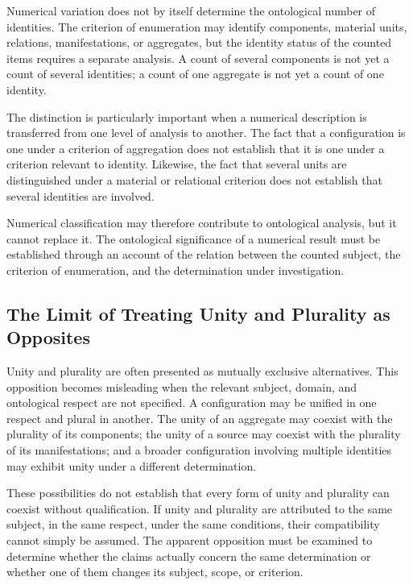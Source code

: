 Numerical variation does not by itself determine
the ontological number of identities. The criterion
of enumeration may identify components, material
units, relations, manifestations, or aggregates,
but the identity status of the counted items
requires a separate analysis. A count of several
components is not yet a count of several identities;
a count of one aggregate is not yet a count of
one identity.

The distinction is particularly important when
a numerical description is transferred from one
level of analysis to another. The fact that a
configuration is one under a criterion of
aggregation does not establish that it is one
under a criterion relevant to identity. Likewise,
the fact that several units are distinguished
under a material or relational criterion does
not establish that several identities are involved.

Numerical classification may therefore contribute
to ontological analysis, but it cannot replace it.
The ontological significance of a numerical result
must be established through an account of the
relation between the counted subject, the criterion
of enumeration, and the determination under
investigation.

\subsection{The Limit of Treating Unity and Plurality as Opposites}

Unity and plurality are often presented as
mutually exclusive alternatives. This opposition
becomes misleading when the relevant subject,
domain, and ontological respect are not specified.
A configuration may be unified in one respect
and plural in another. The unity of an aggregate
may coexist with the plurality of its components;
the unity of a source may coexist with the
plurality of its manifestations; and a broader
configuration involving multiple identities
may exhibit unity under a different determination.

These possibilities do not establish that every
form of unity and plurality can coexist without
qualification. If unity and plurality are attributed
to the same subject, in the same respect, under
the same conditions, their compatibility cannot
simply be assumed. The apparent opposition must
be examined to determine whether the claims
actually concern the same determination or whether
one of them changes its subject, scope, or criterion.

